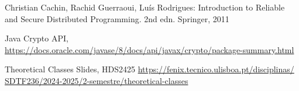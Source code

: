 \documentclass[runningheads]{llncs}
\begin{document}
\begin{thebibliography}{8}

Christian Cachin, Rachid Guerraoui, Luís Rodrigues: Introduction to Reliable and
Secure Distributed Programming. 2nd edn. Springer, 2011

Java Crypto API,
\url{https://docs.oracle.com/javase/8/docs/api/javax/crypto/package-summary.html}

Theoretical Classes Slides, HDS2425
\url{https://fenix.tecnico.ulisboa.pt/disciplinas/ SDTF236/2024-2025/2-semestre/theoretical-classes}
\end{thebibliography}
\end{document}
